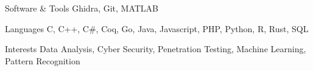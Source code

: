 
\begin{cvskills}
  \cvskill
    {Software \& Tools}
    {Ghidra, Git, MATLAB}

  \cvskill
    {Languages}
    {C, C++, C\#, Coq, Go, Java, Javascript, PHP, Python, R, Rust, SQL}

  \cvskill
    {Interests}
    {Data Analysis, Cyber Security, Penetration Testing, Machine Learning, Pattern Recognition}
\end{cvskills}
